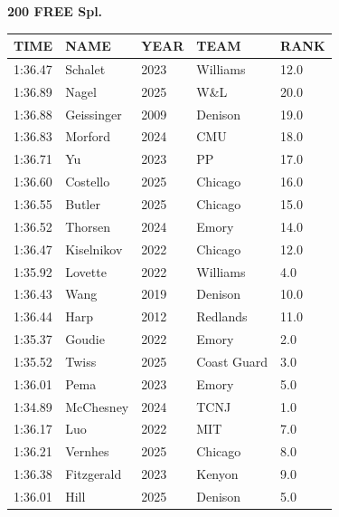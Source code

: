 \begin{table}[H]
\centering
\begin{minipage}[t]{0.6\textwidth}
\centering
\textbf{200 FREE Spl.}\\[0.1cm]
\begin{tabular}{@{}p{1.8cm}p{2.8cm}p{1.2cm}p{1.4cm}p{0.8cm}@{}}
\hline
    \textbf{TIME} & \textbf{NAME} & \textbf{YEAR} & \textbf{TEAM} & \textbf{RANK} \\
\hline
    1:36.47 & Schalet & 2023 & Williams & 12.0 \\
    1:36.89 & Nagel & 2025 & W\&L & 20.0 \\
    1:36.88 & Geissinger & 2009 & Denison & 19.0 \\
    1:36.83 & Morford & 2024 & CMU & 18.0 \\
    1:36.71 & Yu & 2023 & PP & 17.0 \\
    1:36.60 & Costello & 2025 & Chicago & 16.0 \\
    1:36.55 & Butler & 2025 & Chicago & 15.0 \\
    1:36.52 & Thorsen & 2024 & Emory & 14.0 \\
    1:36.47 & Kiselnikov & 2022 & Chicago & 12.0 \\
    1:35.92 & Lovette & 2022 & Williams & 4.0 \\
    1:36.43 & Wang & 2019 & Denison & 10.0 \\
    1:36.44 & Harp & 2012 & Redlands & 11.0 \\
    1:35.37 & Goudie & 2022 & Emory & 2.0 \\
    1:35.52 & Twiss & 2025 & Coast Guard & 3.0 \\
    1:36.01 & Pema & 2023 & Emory & 5.0 \\
    1:34.89 & McChesney & 2024 & TCNJ & 1.0 \\
    1:36.17 & Luo & 2022 & MIT & 7.0 \\
    1:36.21 & Vernhes & 2025 & Chicago & 8.0 \\
    1:36.38 & Fitzgerald & 2023 & Kenyon & 9.0 \\
    1:36.01 & Hill & 2025 & Denison & 5.0 \\
\hline
\end{tabular}
\end{minipage}
\end{table}

